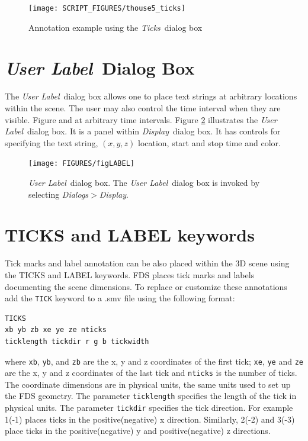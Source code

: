 \documentclass[11pt,twoside]{book}
\begin{document}
\begin{figure}[\figoptions]
\begin{center}
\texttt{[image: SCRIPT\_FIGURES/thouse5\_ticks]}
\end{center}
\caption{Annotation example using the {\em Ticks}\ dialog box}
\label{figTICKSdialogexample}%
\end{figure}

\section{{\em User Label}\ Dialog Box}
The {\em User Label}\ dialog box allows one to place
text strings at arbitrary locations within the scene.  The user may also
control the time interval when they are visible.  Figure  and at arbitrary time intervals.
Figure \ref{figLABELdialog} illustrates the {\em User Label}\
dialog box.  It is a panel within {\em Display}\ dialog box.  It has controls for specifying the text string, $(x,y,z)$ location, start and stop time and color.

\begin{figure}[\figoptions]
\centerline{
\texttt{[image: FIGURES/figLABEL]}
} \caption[{\em User Label}\ dialog box.]{{\em User Label}\ dialog
box. The {\em User Label}\ dialog box is invoked by selecting {\em
Dialogs$>$Display}. } \label{figLABELdialog}
\end{figure}



\section{TICKS and LABEL keywords}
Tick marks and label annotation
can be also placed within the 3D scene using the TICKS and LABEL keywords.
FDS places tick marks and labels
documenting the scene dimensions.  To replace or customize
these annotations add the {\tt TICK} keyword to a .smv file
using the following format:

\begin{lstlisting}
TICKS
xb yb zb xe ye ze nticks
ticklength tickdir r g b tickwidth
\end{lstlisting}

\noindent where {\tt xb}, {\tt yb}, and {\tt zb} are the x, y and
z coordinates of the first tick; {\tt xe}, {\tt ye} and {\tt ze}
are the x, y and z coordinates of the last tick and {\tt nticks}
is the number of ticks. The coordinate dimensions are in physical
units, the same units used to set up the FDS geometry. The
parameter {\tt ticklength} specifies the length of the tick in
physical units. The parameter {\tt tickdir} specifies the tick
direction.  For example 1(-1) places ticks in the
positive(negative) x direction. Similarly, 2(-2) and 3(-3) place
ticks in the positive(negative) y and positive(negative) z
directions.
\end{document}

